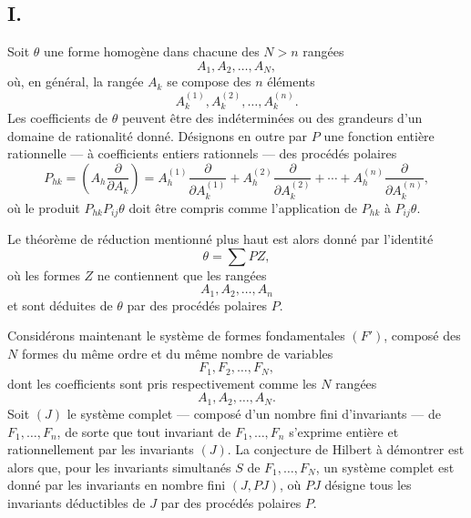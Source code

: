 \subsection*{I.}
Soit $\theta$ une forme homogène dans chacune des $N>n$ rangées
\[
  A_1,A_2,\ldots,A_N,
\]
où, en général, la rangée $A_k$ se compose des $n$ éléments
\[
  A_k^{(1)},A_k^{(2)},\ldots,A_k^{(n)}.
\]
Les coefficients de $\theta$ peuvent être des indéterminées ou des grandeurs d'un domaine de rationalité donné. Désignons en outre par $P$ une fonction entière rationnelle --- à coefficients entiers rationnels --- des procédés polaires
\[
  P_{hk}=\left(A_h\frac{\partial}{\partial A_k}\right)
  =A_h^{(1)}\frac{\partial}{\partial A_k^{(1)}}+
   A_h^{(2)}\frac{\partial}{\partial A_k^{(2)}}+
   \cdots+
   A_h^{(n)}\frac{\partial}{\partial A_k^{(n)}},
\]
où le produit $P_{hk}P_{ij}\theta$ doit être compris comme l'application de $P_{hk}$ à $P_{ij}\theta$.

Le théorème de réduction mentionné plus haut est alors donné par l'identité
\begin{equation}
  \theta=\sum PZ,
\tag{1}
\end{equation}
où les formes $Z$ ne contiennent que les rangées
\[
  A_1,A_2,\ldots,A_n
\]
et sont déduites de $\theta$ par des procédés polaires $P$.

Considérons maintenant le système de formes fondamentales $(F')$, composé des $N$ formes du même ordre et du même nombre de variables
\[
  F_1,F_2,\ldots,F_N,
\]
dont les coefficients sont pris respectivement comme les $N$ rangées
\[
  A_1,A_2,\ldots,A_N.
\]
Soit $(J)$ le système complet --- composé d'un nombre fini d'invariants --- de $F_1,\ldots,F_n$, de sorte que tout invariant de $F_1,\ldots,F_n$ s'exprime entière et rationnellement par les invariants $(J)$. La conjecture de Hilbert à démontrer est alors que, pour les invariants simultanés $S$ de $F_1,\ldots,F_N$, un système complet est donné par les invariants en nombre fini $(J,PJ)$, où $PJ$ désigne tous les invariants déductibles de $J$ par des procédés polaires $P$.

